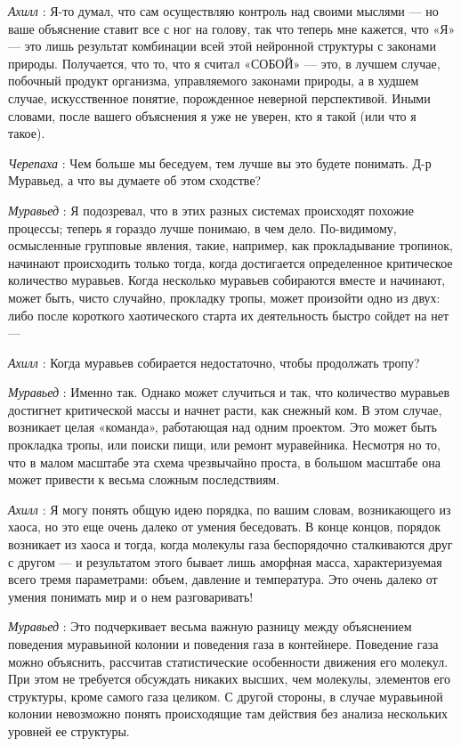\documentclass[../main.tex]{subfiles}
\begin{document}
\begin{dialogue}
\emph{Ахилл} : Я-то думал, что сам осуществляю контроль над своими мыслями --- но ваше объяснение ставит все с ног на голову, так что теперь мне кажется, что «Я» --- это лишь результат комбинации всей этой нейронной структуры с законами природы. Получается, что то, что я считал «СОБОЙ» --- это, в лучшем случае, побочный продукт организма, управляемого законами природы, а в худшем случае, искусственное понятие, порожденное неверной перспективой. Иными словами, после вашего объяснения я уже не уверен, кто я такой (или что я такое).

\emph{Черепаха} : Чем больше мы беседуем, тем лучше вы это будете понимать. Д-р Муравьед, а что вы думаете об этом сходстве?

\emph{Муравьед} : Я подозревал, что в этих разных системах происходят похожие процессы; теперь я гораздо лучше понимаю, в чем дело. По-видимому, осмысленные групповые явления, такие, например, как прокладывание тропинок, начинают происходить только тогда, когда достигается определенное критическое количество муравьев. Когда несколько муравьев собираются вместе и начинают, может быть, чисто случайно, прокладку тропы, может произойти одно из двух: либо после короткого хаотического старта их деятельность быстро сойдет на нет ---

\emph{Ахилл} : Когда муравьев собирается недостаточно, чтобы продолжать тропу?

\emph{Муравьед} : Именно так. Однако может случиться и так, что количество муравьев достигнет критической массы и начнет расти, как снежный ком. В этом случае, возникает целая «команда», работающая над одним проектом. Это может быть прокладка тропы, или поиски пищи, или ремонт муравейника. Несмотря но то, что в малом масштабе эта схема чрезвычайно проста, в большом масштабе она может привести к весьма сложным последствиям.

\emph{Ахилл} : Я могу понять общую идею порядка, по вашим словам, возникающего из хаоса, но это еще очень далеко от умения беседовать. В конце концов, порядок возникает из хаоса и тогда, когда молекулы газа беспорядочно сталкиваются друг с другом --- и результатом этого бывает лишь аморфная масса, характеризуемая всего тремя параметрами: объем, давление и температура. Это очень далеко от умения понимать мир и о нем разговаривать!

\emph{Муравьед} : Это подчеркивает весьма важную разницу между объяснением поведения муравьиной колонии и поведения газа в контейнере. Поведение газа можно объяснить, рассчитав статистические особенности движения его молекул. При этом не требуется обсуждать никаких высших, чем молекулы, элементов его структуры, кроме самого газа целиком. С другой стороны, в случае муравьиной колонии невозможно понять происходящие там действия без анализа нескольких уровней ее структуры.


\end{dialogue}
\end{document}
